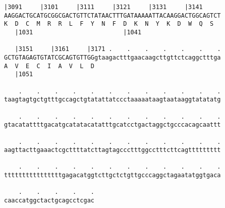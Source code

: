 \documentclass{article}
\begin{document}
\newpage
\begin{Verbatim}[fontfamily=courier]
   |3091     |3101     |3111     |3121     |3131     |3141  
AAGGACTGCATGCGGCGACTGTTCTATAACTTTGATAAAAATTACAAGGACTGGCAGTCT
K  D  C  M  R  R  L  F  Y  N  F  D  K  N  Y  K  D  W  Q  S  
   |1031                         |1041                      

   |3151     |3161     |3171 .    .    .    .    .    .    .
GCTGTAGAGTGTATCGCAGTGTTGGgtaagactttgaacaagcttgttctcaggctttga
A  V  E  C  I  A  V  L  D                                   
   |1051                                                    

    .    .    .    .    .    .    .    .    .    .    .    .
taagtagtgctgtttgccagctgtatattatccctaaaaataagtaataaggtatatatg

    .    .    .    .    .    .    .    .    .    .    .    .
gtacatattttgacatgcatatacatatttgcatcctgactaggctgcccacagcaattt

    .    .    .    .    .    .    .    .    .    .    .    .
aagttacttgaaactcgcttttatcttagtagccctttggcctttcttcagttttttttt

    .    .    .    .    .    .    .    .    .    .    .    .
ttttttttttttttttgagacatggtcttgctctgttgcccaggctagaatatggtgaca

    .    .    .    .    .
caaccatggctactgcagcctcgac
\end{Verbatim}
\newpage
\end{document}
